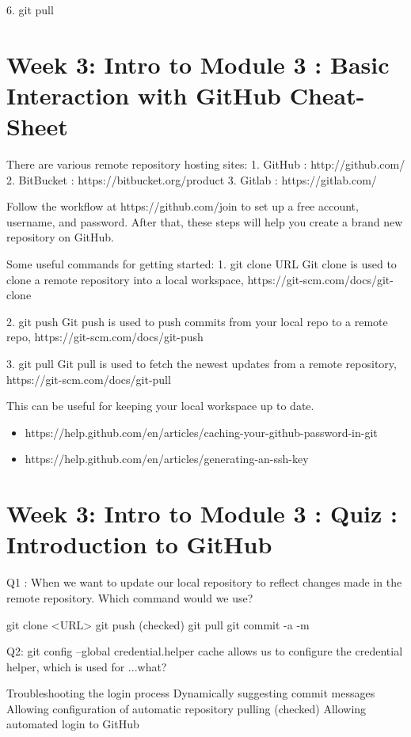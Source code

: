 \documentclass[11pt, onecolumn]{article}
\begin{document}
6. git pull



\section{Week 3: Intro to Module 3 : Basic Interaction with GitHub Cheat-Sheet}

There are various remote repository hosting sites:
1. GitHub : http://github.com/
2. BitBucket : https://bitbucket.org/product
3. Gitlab : https://gitlab.com/

Follow the workflow at https://github.com/join to set up a free account, username, and password. After that, these steps will help you create a brand new repository on GitHub.

Some useful commands for getting started:
1. git clone URL       Git clone is used to clone a remote repository into a local workspace, https://git-scm.com/docs/git-clone

2. git push 		Git push is used to push commits from your local repo to a remote repo, https://git-scm.com/docs/git-push

3. git pull		Git pull is used to fetch the newest updates from a remote repository, https://git-scm.com/docs/git-pull

This can be useful for keeping your local workspace up to date.

\begin{itemize}
\item https://help.github.com/en/articles/caching-your-github-password-in-git
\item https://help.github.com/en/articles/generating-an-ssh-key
\end{itemize} 



\section{Week 3: Intro to Module 3 : Quiz : Introduction to GitHub}

Q1 : When we want to update our local repository to reflect changes made in the remote repository. Which command would we use?

git clone <URL>
git push
(checked) git pull 
git commit -a -m


Q2: git config --global credential.helper cache allows us to configure the credential helper, which is used for ...what?

Troubleshooting the login process
Dynamically suggesting commit messages
Allowing configuration of automatic repository pulling
(checked) Allowing automated login to GitHub
\end{document}
